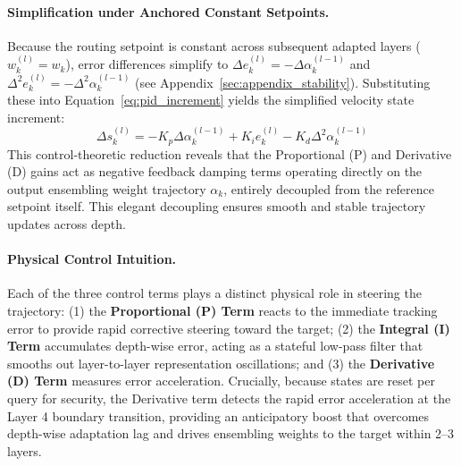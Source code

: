 \paragraph{Simplification under Anchored Constant Setpoints.}
Because the routing setpoint is constant across subsequent adapted layers ($w_k^{(l)} = w_k$), error differences simplify to $\Delta e_k^{(l)} = -\Delta \alpha_k^{(l-1)}$ and $\Delta^2 e_k^{(l)} = -\Delta^2 \alpha_k^{(l-1)}$ (see Appendix~\ref{sec:appendix_stability}). Substituting these into Equation~\ref{eq:pid_increment} yields the simplified velocity state increment:
\begin{equation}
\Delta s_k^{(l)} = -K_p \Delta \alpha_k^{(l-1)} + K_i e_k^{(l)} - K_d \Delta^2 \alpha_k^{(l-1)}
\label{eq:simplified_update}
\end{equation}
This control-theoretic reduction reveals that the Proportional (P) and Derivative (D) gains act as negative feedback damping terms operating directly on the output ensembling weight trajectory $\alpha_k$, entirely decoupled from the reference setpoint itself. This elegant decoupling ensures smooth and stable trajectory updates across depth.

\paragraph{Physical Control Intuition.}
Each of the three control terms plays a distinct physical role in steering the trajectory: (1) the \textbf{Proportional (P) Term} reacts to the immediate tracking error to provide rapid corrective steering toward the target; (2) the \textbf{Integral (I) Term} accumulates depth-wise error, acting as a stateful low-pass filter that smooths out layer-to-layer representation oscillations; and (3) the \textbf{Derivative (D) Term} measures error acceleration. Crucially, because states are reset per query for security, the Derivative term detects the rapid error acceleration at the Layer 4 boundary transition, providing an anticipatory boost that overcomes depth-wise adaptation lag and drives ensembling weights to the target within 2--3 layers.

